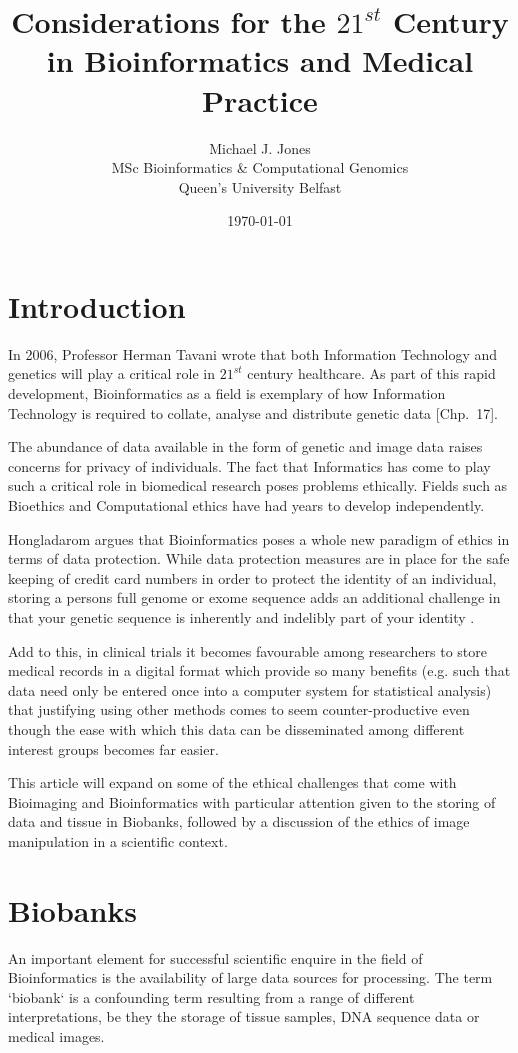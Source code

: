 \documentclass[british,a4paper, 12pt]{article}
\title{Considerations for the $21^{st}$ Century in Bioinformatics and Medical Practice}
\author{Michael J. Jones \\
  MSc Bioinformatics \& Computational Genomics \\
  Queen's University Belfast}
\date{\today}
\begin{document}
\maketitle
  
\section{Introduction}
In 2006, Professor Herman Tavani wrote that both Information Technology and
genetics will play a critical role in $21^{st}$ century healthcare. As part of
this rapid development, Bioinformatics as a field is exemplary of how
Information Technology is required to collate, analyse and distribute genetic
data \parencite{tavani2006ethics}[Chp.~17].

The abundance of data available in the form of genetic and image data raises
concerns for privacy of individuals. The fact that Informatics has come to
play such a critical role in biomedical research poses problems ethically.
Fields such as Bioethics and Computational ethics have had years to develop
independently.

Hongladarom argues that Bioinformatics poses a whole new paradigm of ethics in
terms of data protection. While data protection measures are in place for the
safe keeping of credit card numbers in order to protect the identity of an
individual, storing a persons full genome or exome sequence adds an additional
challenge in that your genetic sequence is inherently and indelibly part of
your identity \parencite{hongladarom2006ethics}.

Add to this, in clinical trials it becomes favourable among researchers to 
store medical records in a digital format which provide so many benefits (e.g. 
such that data need only be entered once into a computer system for statistical 
analysis) \parencite{parizel2011keep} that justifying using other methods comes to seem
counter-productive even though the ease with which this data can be disseminated among
different interest groups becomes far easier.

This article will expand on some of the ethical challenges that come with
Bioimaging and Bioinformatics with particular attention given to the storing
of data and tissue in Biobanks, followed by a discussion of the ethics of
image manipulation in a scientific context.

\section{Biobanks}
An important element for successful scientific enquire in the field of
Bioinformatics is the availability of large data sources for processing. The
term `biobank` is a confounding term resulting from a range of different
interpretations, be they the storage of tissue samples, DNA sequence data or
medical images.
\end{document}
